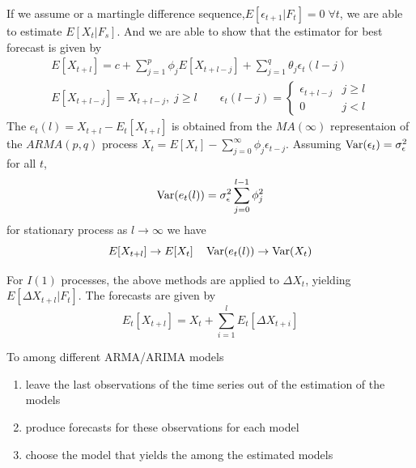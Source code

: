 If we assume  or a martingle difference sequence,$E[\epsilon_{t+1}|F_t]=0\;\forall t$, we are able to estimate $E[X_t|F_s]$.
And we are able to show that the estimator for best forecast is given by 
\begin{gather*}
    E[X_{t+l}] = c + \sum_{j=1}^{p}\phi_j E[X_{t+l-j}] + \sum_{j=1}^{q}\theta_j \epsilon_t(l-j)\\
    E[X_{t+l-j}] = X_{t+l-j},\; j\geq l\qquad \epsilon_t(l-j)=\begin{cases}
        \epsilon_{t+l-j} &  j\geq l\\
        0 &  j<l
    \end{cases}
\end{gather*}
The  $e_t(l) = X_{t+l} - E_t[X_{t+l}]$ is obtained from the $MA(\infty)$ representaion of the $ARMA(p,q)$ process $X_t = E[X_t] - \sum_{j=0}^{\infty}\phi_j\epsilon_{t-j}$.
Assuming $\operatorname{Var}(\epsilon_t) = \sigma^2_{\epsilon}$ for all $t$,
\begin{equation*}
    \operatorname{Var}(e_t(l)) = \sigma^2_{\epsilon}\sum_{j=0}^{l-1} \phi^2_j
\end{equation*} 
for stationary process as $l\to\infty$ we have 
\begin{equation*}
    E[X_{t+l}] \to E[X_t]\quad \operatorname{Var}(e_t(l)) \to \operatorname{Var}(X_t)
\end{equation*}

For $I(1)$ processes, the above methods are applied to $\Delta X_t$, yielding $E[\Delta X_{t+l}|F_t]$. The forecasts are given by 
\begin{equation*}
    E_t[X_{t+l}] = X_t + \sum_{i=1}^{l} E_t[\Delta X_{t+i}]
\end{equation*}

To  among different ARMA/ARIMA models
\begin{enumerate}
    \item leave the last observations of the time series out of the estimation of the models
    \item produce forecasts for these observations for each model 
    \item choose the model that yields the  among the estimated models
\end{enumerate}


